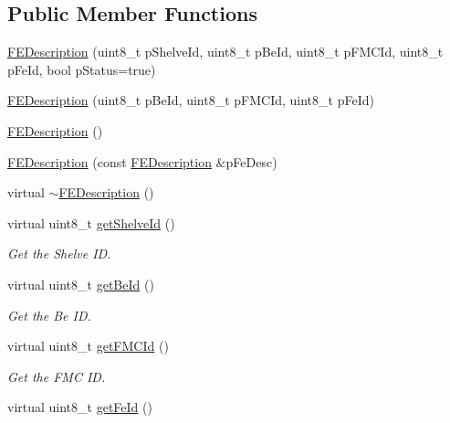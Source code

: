 \subsection*{Public Member Functions}
\begin{DoxyCompactItemize}
\item 
\hyperlink{class_ph2___hw_description_1_1_f_e_description_a23be149c77c625424510e88adf3e95d4}{F\-E\-Description} (uint8\-\_\-t p\-Shelve\-Id, uint8\-\_\-t p\-Be\-Id, uint8\-\_\-t p\-F\-M\-C\-Id, uint8\-\_\-t p\-Fe\-Id, bool p\-Status=true)
\item 
\hyperlink{class_ph2___hw_description_1_1_f_e_description_acbcf750f0bf74a954eb50db7255e5c26}{F\-E\-Description} (uint8\-\_\-t p\-Be\-Id, uint8\-\_\-t p\-F\-M\-C\-Id, uint8\-\_\-t p\-Fe\-Id)
\item 
\hyperlink{class_ph2___hw_description_1_1_f_e_description_abc5f53987051c0d9746c97e1d993b143}{F\-E\-Description} ()
\item 
\hyperlink{class_ph2___hw_description_1_1_f_e_description_a1169ae7f8f71a37ff35b7c31f6452611}{F\-E\-Description} (const \hyperlink{class_ph2___hw_description_1_1_f_e_description}{F\-E\-Description} \&p\-Fe\-Desc)
\item 
virtual \hyperlink{class_ph2___hw_description_1_1_f_e_description_a6f055cd3fade537864dd7c3b34fede39}{$\sim$\-F\-E\-Description} ()
\item 
virtual uint8\-\_\-t \hyperlink{class_ph2___hw_description_1_1_f_e_description_a4e532c3b78e6a4a1b5f0022005898e25}{get\-Shelve\-Id} ()
\begin{DoxyCompactList}\small\item\em Get the Shelve I\-D. \end{DoxyCompactList}\item 
virtual uint8\-\_\-t \hyperlink{class_ph2___hw_description_1_1_f_e_description_a9077e5848363bf04b1c5860726879e79}{get\-Be\-Id} ()
\begin{DoxyCompactList}\small\item\em Get the Be I\-D. \end{DoxyCompactList}\item 
virtual uint8\-\_\-t \hyperlink{class_ph2___hw_description_1_1_f_e_description_a3bf79b7197bf731c85e9041f94ad4351}{get\-F\-M\-C\-Id} ()
\begin{DoxyCompactList}\small\item\em Get the F\-M\-C I\-D. \end{DoxyCompactList}\item 
virtual uint8\-\_\-t \hyperlink{class_ph2___hw_description_1_1_f_e_description_ab282dc785d2db2e8837b082d85fb9bb3}{get\-Fe\-Id} ()

\end{DoxyCompactItemize}
